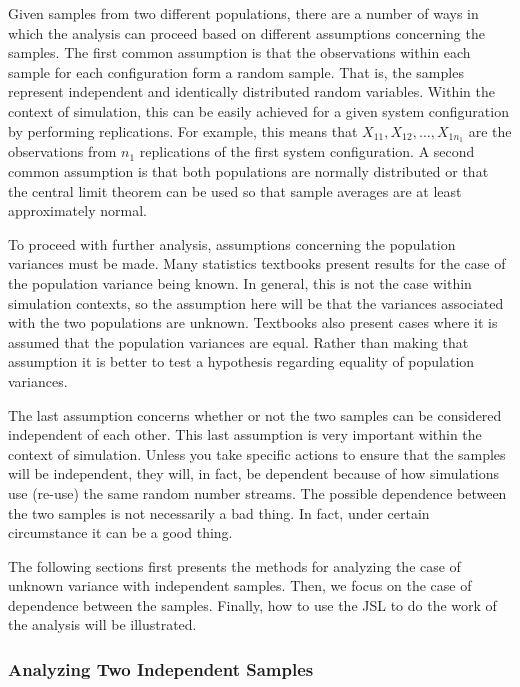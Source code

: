 \documentclass[
]{book}
\theoremstyle{definition}
\theoremstyle{definition}
\theoremstyle{definition}
\theoremstyle{definition}
\theoremstyle{remark}
\begin{document}
Given samples from two different populations, there are a number of ways
in which the analysis can proceed based on different assumptions
concerning the samples. The first common assumption is that the
observations within each sample for each configuration form a random
sample. That is, the samples represent independent and identically
distributed random variables. Within the context of simulation, this can
be easily achieved for a given system configuration by performing
replications. For example, this means that
\(X_{11}, X_{12},\ldots, X_{1 n_1}\) are the observations from \(n_1\)
replications of the first system configuration. A second common
assumption is that both populations are normally distributed or that the
central limit theorem can be used so that sample averages are at least
approximately normal.

To proceed with further analysis, assumptions concerning the population
variances must be made. Many statistics textbooks present results for
the case of the population variance being known. In general, this is not
the case within simulation contexts, so the assumption here will be that
the variances associated with the two populations are unknown. Textbooks
also present cases where it is assumed that the population variances are
equal. Rather than making that assumption it is better to test a
hypothesis regarding equality of population variances.

The last assumption concerns whether or not the two samples can be
considered independent of each other. This last assumption is very
important within the context of simulation. Unless you take specific
actions to ensure that the samples will be independent, they will, in
fact, be dependent because of how simulations use (re-use) the same
random number streams. The possible dependence between the two samples
is not necessarily a bad thing. In fact, under certain circumstance it
can be a good thing.

The following sections first presents the methods for analyzing the case
of unknown variance with independent samples. Then, we focus on the case
of dependence between the samples. Finally, how to use the JSL to do the
work of the analysis will be illustrated.

\hypertarget{simoa:comparingSystems:twoIND}{%
\subsubsection{Analyzing Two Independent Samples}\label{simoa:comparingSystems:twoIND}}
\end{document}
